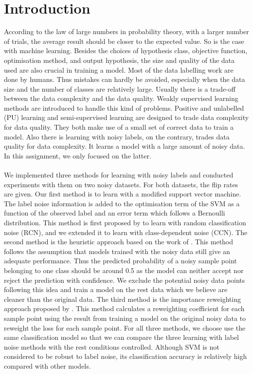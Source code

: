 \documentclass{article} %
\begin{document}
\section{Introduction}
According to the law of large numbers in probability theory, with a larger number of trials, the average result should be closer to the expected value. So is the case with machine learning. Besides the choices of hypothesis class, objective function, optimisation method, and output hypothesis, the size and quality of the data used are also crucial in training a model. Most of the data labelling work are done by humans. Thus mistakes can hardly be avoided, especially when the data size and the number of classes are relatively large. Usually there is a trade-off between the data complexity and the data quality. Weakly supervised learning methods are introduced to handle this kind of problems. Positive and unlabelled (PU) learning and semi-supervised learning are designed to trade data complexity for data quality. They both make use of a small set of correct data to train a model. Also there is learning with noisy labels, on the contrary, trades data quality for data complexity. It learns a model with a large amount of noisy data. In this assignment, we only focused on the latter.\\ \\
We implemented three methods for learning with noisy labels and conducted experiments with them on two noisy datasets. For both datasets, the flip rates are given. Our first method is to learn with a modified support vector machine. The label noise information is added to the optimisation term of the SVM as a function of the observed label and an error term which follows a Bernoulli distribution. This method is first proposed by \citet{pmlr-v20-biggio11} to learn with random classification noise (RCN), and we extended it to learn with class-dependent noise (CCN). The second method is the heuristic approach based on the work of \citet{Wu03probabilityestimates}. This method follows the assumption that models trained with the noisy data still give an adequate performance. Thus the predicted probability of a noisy sample point belonging to one class should be around 0.5 as the model can neither accept nor reject the prediction with confidence. We exclude the potential noisy data points following this idea and train a model on the rest data which we believe are cleaner than the original data. The third method is the importance reweighting approach proposed by \citet{liu2016classification}. This method calculates a reweighting coefficient for each sample point using the result from training a model on the original noisy data to reweight the loss for each sample point. For all three methods, we choose use the same classification model so that we can compare the three learning with label noise methods with the rest conditions controlled. Although SVM is not considered to be robust to label noise, its classification accuracy is relatively high compared with other models. \\ \\
\end{document}
